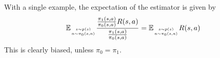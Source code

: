 \begin{answer}
    With a single example, the expectation of the estimator is given by
$$
\mathbb E_{s\sim p(s)\atop a\sim\pi_0(s, a)}\frac{\frac{\pi_1(s, a)}{\pi_0(s, a) }R(s, a)}{\frac{\pi_1(s, a)}{\pi_0(s, a)}} = \mathbb E_{s\sim p(s)\atop a\sim\pi_0(s, a)}R(s, a)
$$
This is clearly biased, unless $\pi_0 = \pi_1$.

\end{answer}
